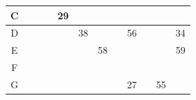\documentclass[xcolor=table]{beamer}
\begin{document}
\begin{frame}
\begin{table}[]
\begin{tabular}{|c|c|c|c|c|c|c|c|c|c|c|c|}
\cellcolor[HTML]{EFEFEF}C &                                                  &                                                  &                                                  & 29                                               &                                                  &                                                  &                                                  &                                                  &                                                  &                                                  &                                                  \\ \hline
\cellcolor[HTML]{EFEFEF}D &                                                  &                                                  &                                                  &                                                  & 38                                               &                                                  &                                                  & 56                                               &                                                  &                                                  & 34                                               \\ \hline
\cellcolor[HTML]{EFEFEF}E &                                                  &                                                  &                                                  &                                                  &                                                  & 58                                               &                                                  &                                                  &                                                  &                                                  & 59                                               \\ \hline
\cellcolor[HTML]{EFEFEF}F &                                                  &                                                  &                                                  &                                                  &                                                  &                                                  &                                                  &                                                  &                                                  &                                                  &                                                  \\ \hline
\cellcolor[HTML]{EFEFEF}G &                                                  &                                                  &                                                  &                                                  &                                                  &                                                  &                                                  & 27                                               &                                                  & 55                                               &                                                  \\ \hline

\end{tabular}
\end{table}
\end{frame}
\end{document}
